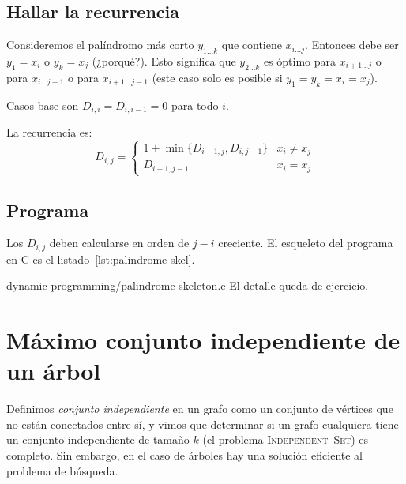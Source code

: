 \subsection{Hallar la recurrencia}
\label{sec:hallar-recurrencia}

  Consideremos el palíndromo más corto \(y_{1 \ldots k}\)
  que contiene \(x_{i \ldots j}\).
  Entonces debe ser \(y_1 = x_i\) o \(y_k = x_j\)
  (¿porqué?).
  Esto significa que \(y_{2 \ldots k}\)
  es óptimo para \(x_{i + 1 \ldots j}\)
  o para \(x_{i \ldots j - 1}\)
  o para \(x_{i + 1 \ldots j - 1}\)
  (este caso solo es posible si \(y_1 = y_k = x_i = x_j\)).

  Casos base son \(D_{i, i} = D_{i, i - 1} = 0\) para todo \(i\).

  La recurrencia es:
  \begin{equation*}
    D_{i, j}
      = \begin{cases}
	  1 + \min\{ D_{i + 1, j}, D_{i, j - 1}\} & x_i \ne x_j \\
	  D_{i + 1, j - 1}			  & x_i = x_j
	\end{cases}
  \end{equation*}

\subsection{Programa}
\label{sec:programa}

  Los \(D_{i, j}\) deben calcularse en orden de \(j - i\) creciente.
  El esqueleto del programa en C es el listado~\ref{lst:palindrome-skel}.
  
		  {dynamic-programming/palindrome-skeleton.c}
  El detalle queda de ejercicio.

\section{Máximo conjunto independiente de un árbol}
\label{sec:IndependentSet-tree}

  Definimos \emph{conjunto independiente} en un grafo
  como un conjunto de vértices que no están conectados entre sí,
  y vimos que determinar si un grafo cualquiera
  tiene un conjunto independiente de tamaño \(k\)
  (el problema \textsc{Independent~Set})
  es \NP\nobreakdash-completo.
  Sin embargo,
  en el caso de árboles hay una solución eficiente al problema de búsqueda.

